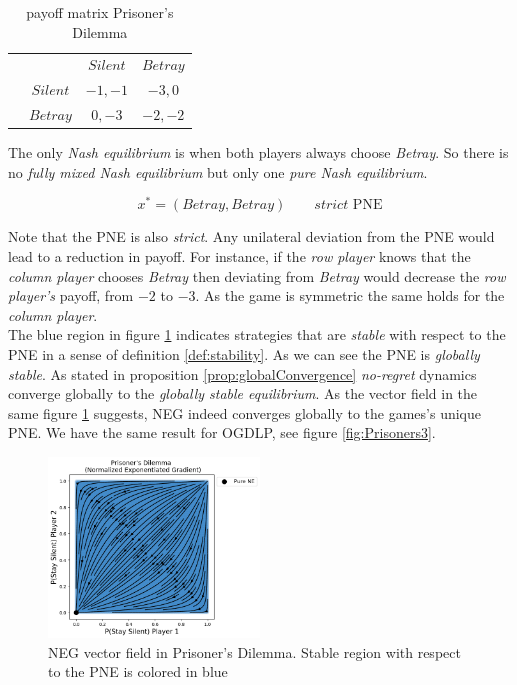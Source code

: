 \begin{table}[H]\centering
\setlength{\extrarowheight}{2pt}
\begin{tabular}{cc|c|c|}
  & \multicolumn{1}{c}{} & \multicolumn{1}{c}{$Silent$}  & \multicolumn{1}{c}{$Betray$} \\\cline{3-4}
  & $Silent$ & $-1,-1$ & $-3,0$ \\\cline{3-4}
  & $Betray$ & $0,-3$ & $-2,-2$ \\\cline{3-4}
\end{tabular}\caption{\label{tab:payoffPrisoners}payoff matrix Prisoner's Dilemma}
\end{table}

The only \textit{Nash equilibrium} is when both players always choose \textit{Betray}. So there is no \textit{fully mixed Nash equilibrium} but only one \textit{pure Nash equilibrium}. 

\begin{equation*}
    x^{*} = (Betray,Betray) \qquad \textit{strict }\text{PNE}
\end{equation*}

Note that the PNE is also \textit{strict}. Any unilateral deviation from the PNE would lead to a reduction in payoff. For instance, if the \textit{row player} knows that the \textit{column player}  chooses \textit{Betray} then deviating from \textit{Betray} would decrease the \textit{row player's} payoff, from $-2$ to $-3$. As the game is symmetric the same holds for the \textit{column player}. \\

The blue region in figure \ref{fig:Prisoners2} indicates strategies that are \textit{stable} with respect to the PNE in a sense of definition \ref{def:stability}. As we can see the PNE is \textit{globally stable}. As stated in proposition \ref{prop:globalConvergence} \textit{no-regret} dynamics converge globally to the \textit{globally stable equilibrium}. As the vector field in the same figure \ref{fig:Prisoners2} suggests, NEG indeed converges globally to the games's unique PNE. We have the same result for OGDLP, see figure \ref{fig:Prisoners3}.

\begin{figure}[H]
    \centering
    \captionsetup{justification=centering}
    \includegraphics[width=0.5\textwidth]{logos/Prisoners2.png}
    \caption{NEG vector field in Prisoner's Dilemma. Stable region with respect to the PNE is colored in blue}
    \label{fig:Prisoners2}
\end{figure}

